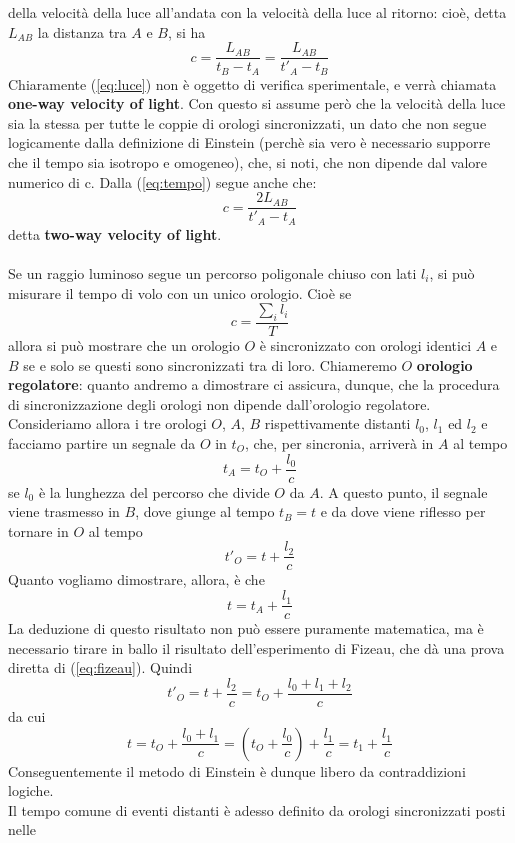 \documentclass[a4paper,11pt]{book}
\theoremstyle{plain}
\theoremstyle{definition}
\begin{document}
della velocità della luce all'andata con la velocità della luce al ritorno: cioè, detta $L_{AB}$ la 
distanza tra $A$ e $B$, si ha
\begin{equation}\label{eq:luce}
c=\frac{L_{AB}}{t_B-t_A}=\frac{L_{AB}}{t'_A-t_B}
\end{equation} 
 Chiaramente (\ref{eq:luce}) non è oggetto di verifica sperimentale, e verrà chiamata \textbf{one-way velocity of light}. Con questo si assume però 
che la velocità della luce sia la stessa per tutte le coppie di orologi sincronizzati, un dato 
che non segue logicamente dalla definizione di Einstein (perchè sia vero è necessario supporre che il tempo sia isotropo e omogeneo), che, si noti, che non dipende dal valore numerico di c. Dalla (\ref{eq:tempo}) segue anche che:
\[
c=\frac{2L_{AB}}{t'_A-t_A}
\]
detta \textbf{two-way velocity of light}. 
\\
\\
Se un raggio luminoso segue un percorso poligonale chiuso con lati $l_i$, si può misurare il 
tempo di volo con un unico orologio. Cioè se
\begin{equation}\label{eq:fizeau}
c=\frac{\sum_i l_i}{T}
\end{equation}
allora si può mostrare che un orologio $O$ è sincronizzato con orologi identici $A$ e $B$ se e solo se questi sono sincronizzati tra di loro. Chiameremo $O$ \textbf{orologio regolatore}: quanto andremo a dimostrare ci assicura, dunque, che la procedura di sincronizzazione degli orologi non dipende dall'orologio regolatore. Consideriamo allora i tre orologi $O$, $A$, $B$ rispettivamente distanti $l_0$, $l_1$ ed $l_2$ e facciamo partire un segnale da $O$ in $t_O$, che, per sincronia, arriverà in $A$ al tempo
\[
t_A=t_O+\frac{l_0}{c}
\]
se $l_0$ è la lunghezza del percorso che divide $O$ da $A$. A questo punto, il segnale viene trasmesso in $B$, dove giunge al tempo $t_B=t$ e da dove viene riflesso per tornare in $O$ al tempo
\[
t'_O=t+\frac{l_2}{c}
\]
Quanto vogliamo dimostrare, allora, è che
\[
t=t_A+\frac{l_1}{c}
\]
La deduzione di questo risultato non può essere puramente matematica, ma è necessario tirare in ballo il risultato dell'esperimento di Fizeau, che dà una prova diretta di (\ref{eq:fizeau}). Quindi
\[
t'_O=t+\frac{l_2}{c}=t_O+\frac{l_0+l_1+l_2}{c}
\]
da cui
\[
t=t_O+\frac{l_0+l_1}{c}=\left( t_O +\frac{l_0}{c}\right)+\frac{l_1}{c}=t_1+\frac{l_1}{c}
\]
Conseguentemente il metodo di Einstein è dunque libero da contraddizioni logiche. 
\\
Il tempo comune di eventi distanti è adesso definito da orologi sincronizzati posti nelle 
\end{document}
